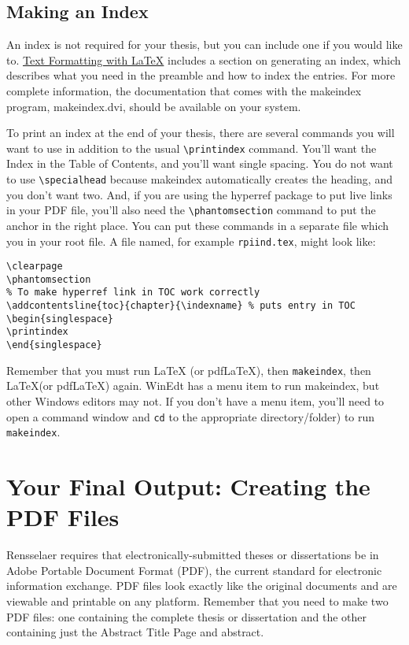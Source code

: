 \documentclass[letterpaper,11pt]{article}
\begin{document}
\subsection{Making an Index}

An index is not required for your thesis, but you can include one if
you would like to.
\href{http://www.rpi.edu/dept/arc/docs/latex/latex-intro.pdf}{Text Formatting with {\LaTeX}}
includes a section on generating an index, which describes what you
need in the preamble and how to index the entries. For more complete information, the
documentation that comes with the makeindex program, makeindex.dvi, should be available
on your system.

To print an index at the end of your thesis, there are several commands you will want to
use in addition to the usual \verb|\printindex| command. You'll want the Index in the Table of
Contents, and you'll want single spacing. You do not want to use \verb|\specialhead| because
makeindex automatically creates the heading, and you don't want two. And, if you are using
the hyperref package to put live links in your PDF file, you'll also need the \verb|\phantomsection|
command to put the anchor in the right place. You can put these commands in a separate file
which you \verb|| in your root file. A file named, for example
\verb|rpiind.tex|, might look like:
\begin{verbatim}
\clearpage
\phantomsection
% To make hyperref link in TOC work correctly
\addcontentsline{toc}{chapter}{\indexname} % puts entry in TOC
\begin{singlespace}
\printindex
\end{singlespace}
\end{verbatim}
Remember that you must run {\LaTeX} (or pdf{\LaTeX}), then \verb|makeindex|, then {\LaTeX}(or pdf{\LaTeX})
again. WinEdt has a menu item to run makeindex, but other Windows editors may not. If you
don't have a menu item, you'll need to open a command window and \verb|cd| to the appropriate
directory/folder) to run \verb|makeindex|.

\section{Your Final Output: Creating the PDF Files}

Rensselaer requires that electronically-submitted theses or
dissertations be in Adobe Portable Document Format (PDF), the current
standard for electronic information exchange. PDF files look exactly
like the original documents and are viewable and printable on any
platform. Remember that you need to make two PDF files: one containing
the complete thesis or dissertation and the other containing just the
Abstract Title Page and abstract.
\end{document}
